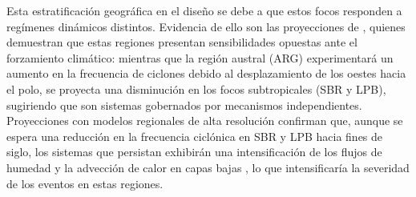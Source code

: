 Esta estratificación geográfica en el diseño se debe a que estos focos responden a regímenes dinámicos distintos. Evidencia de ello son las proyecciones de \citet{dejesus2021multimodel}, quienes demuestran que estas regiones presentan sensibilidades opuestas ante el forzamiento climático: mientras que la región austral (ARG) experimentará un aumento en la frecuencia de ciclones debido al desplazamiento de los oestes hacia el polo, se proyecta una disminución en los focos subtropicales (SBR y LPB), sugiriendo que son sistemas gobernados por mecanismos independientes. Proyecciones con modelos regionales de alta resolución confirman que, aunque se espera una reducción en la frecuencia ciclónica en SBR y LPB hacia fines de siglo, los sistemas que persistan exhibirán una intensificación de los flujos de humedad y la advección de calor en capas bajas \citep{gramcianinov2024early}, lo que intensificaría la severidad de los eventos en estas regiones.
%



